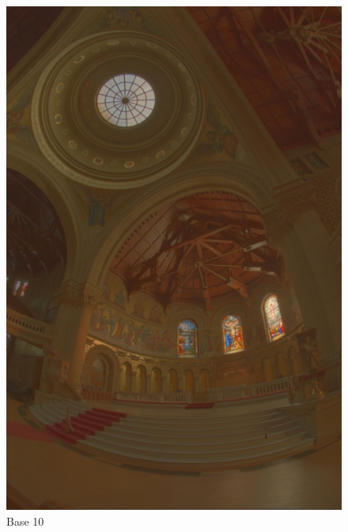\documentclass{article}
\begin{document}
    \begin{figure}[!htb]
      \includegraphics[scale=.4]{./data/1/lgscl/b10.jpg}
      \caption{Base 10}
    \endminipage\hfill

\end{figure}
\end{document}
